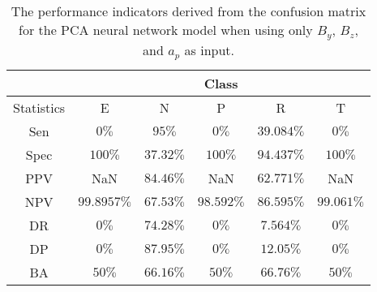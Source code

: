 \begin{table}[!ht]
	\centering
	\begin{tabular}{|c|c|c|c|c|c|}
		\hline
		 & \multicolumn{5}{c|}{Class} \\ \hline
		Statistics & E & N & P & R & T \\ \hline
		Sen & $0\%$ & $95\%$ & $0\%$ & $39.084\%$ & $0\%$ \\ \hline
		Spec & $100\%$ & $37.32\%$ & $100\%$ & $94.437\%$ & $100\%$ \\ \hline
		PPV & NaN & $84.46\%$ & NaN & $62.771\%$ & NaN \\ \hline
		NPV & $99.8957\%$ & $67.53\%$ & $98.592\%$ & $86.595\%$ & $99.061\%$ \\ \hline
		DR & $0\%$ & $74.28\%$ & $0\%$ & $7.564\%$ & $0\%$ \\ \hline
		DP & $0\%$ & $87.95\%$ & $0\%$ & $12.05\%$ & $0\%$ \\ \hline
		BA & $50\%$ & $66.16\%$ & $50\%$ & $66.76\%$ & $50\%$ \\ \hline
	\end{tabular}
	\caption{The performance indicators derived from the confusion matrix for the PCA neural network model when using only $B_{y}$, $B_{z}$, and $a_{p}$ as input.}
	\label{tab:cs:reverse:yzap:pcaNNet}
\end{table}
